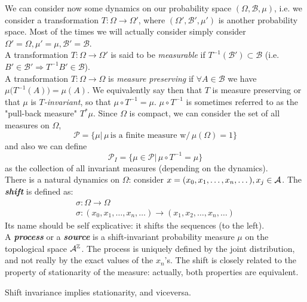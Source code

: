 We can consider now some dynamics on our probability space $(\Omega, \mathscr{B}, \mu)$, i.e. we consider a transformation $T: \Omega \longrightarrow \Omega'$, where $(\Omega', \mathscr{B}', \mu')$ is another probability space. Most of the times we will actually consider simply consider $\Omega' = \Omega, \mu' = \mu, \mathscr{B}' = \mathscr{B}$. 
\\A transformation $T: \Omega \longrightarrow \Omega'$ is said to be \textit{measurable} if $T^{-1}(\mathscr{B}') \subset \mathscr{B}$ (i.e. $B' \in \mathscr{B}' \Rightarrow T^{-1}B' \in \mathscr{B}$).
\\A transformation $T: \Omega \rightarrow \Omega$ is \textit{measure preserving} if $\forall A \in \mathscr{B}$ we have $\mu \big( T^{-1}(A) \big) = \mu(A)$. We equivalently say then that $T$ is measure preserving or that $\mu$ is \textit{$T$-invariant}, so that $\mu \circ T^{-1} = \mu$. $\mu \circ T^{-1}$ is sometimes referred to as the "pull-back measure" $T^* \mu$. Since $\Omega$ is compact, we can consider the set of all measures on $\Omega$, 
\begin{equation}
    \mathcal{P} = \big\{ \mu \big| \, \mu \, \text{is a finite measure w/} \, \mu(\Omega) = 1 \big\}
\end{equation}
and also we can define 
\begin{equation}
    \mathcal{P}_I = \big\{ \mu \in \mathcal{P} \big| \, \mu \circ T^{-1} = \mu \big\}
\end{equation}
as the collection of all invariant measures (depending on the dynamics). 
\\There is a natural dynamics on $\Omega$: consider $x= (x_0,x_1, \dots, x_n, \dots), x_j \in \mathcal{A}$. The \textit{\textbf{shift}} is defined as:
\begin{gather}
    \sigma: \Omega \longrightarrow \Omega\nonumber \\
    \sigma : (x_0,x_1, \dots, x_n, \dots) \longrightarrow (x_1, x_2, \dots, x_n, \dots) 
\end{gather}
Its name should be self explicative: it shifts the sequences (to the left).
\\A \textbf{\textit{process}} or a \textbf{\textit{source}} is a shift-invariant probability measure $\mu$ on the topological space $\mathcal{A}^{\mathbb{Z}}$. The process is uniquely defined by the joint distribution, and not really by the exact values of the $x_n$'s. 
 The shift is closely related to the property of stationarity of the measure: actually, both properties are equivalent.
\begin{prop}
Shift invariance implies stationarity, and viceversa. 
\end{prop}
